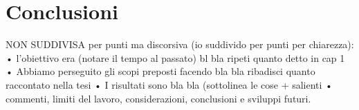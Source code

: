 \chapter{Conclusioni}
\label{sec:conclusioni}

NON SUDDIVISA per punti ma discorsiva (io suddivido per punti per chiarezza):
•	l'obiettivo era (notare il tempo al passato) bl bla ripeti quanto detto in cap 1
•	Abbiamo perseguito gli scopi preposti facendo bla bla ribadisci quanto raccontato nella tesi
•	I risultati sono bla bla (sottolinea le cose + salienti
•	commenti, limiti del lavoro, considerazioni, conclusioni e sviluppi futuri.
